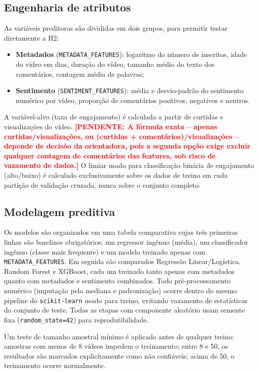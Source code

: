 \documentclass[12pt,a4paper]{article}
\newcommand{\pendente}[1]{\textcolor{red}{\textbf{[PENDENTE: #1]}}}
\begin{document}
\subsection{Engenharia de atributos}

As variáveis preditoras são divididas em dois grupos, para permitir testar diretamente a H2:

\begin{itemize}
    \item \textbf{Metadados} (\texttt{METADATA\_FEATURES}): logaritmo do número de inscritos, idade do vídeo em dias, duração do vídeo, tamanho médio do texto dos comentários, contagem média de palavras;
    \item \textbf{Sentimento} (\texttt{SENTIMENT\_FEATURES}): média e desvio-padrão do sentimento numérico por vídeo, proporção de comentários positivos, negativos e neutros.
\end{itemize}

A variável-alvo (taxa de engajamento) é calculada a partir de curtidas e visualizações do vídeo. \pendente{A fórmula exata -- apenas curtidas/visualizações, ou (curtidas + comentários)/visualizações -- depende de decisão da orientadora, pois a segunda opção exige excluir qualquer contagem de comentários das features, sob risco de vazamento de dados.} O limiar usado para classificação binária de engajamento (alto/baixo) é calculado exclusivamente sobre os dados de treino em cada partição de validação cruzada, nunca sobre o conjunto completo.

\subsection{Modelagem preditiva}

Os modelos são organizados em uma tabela comparativa cujas três primeiras linhas são baselines obrigatórios: um regressor ingênuo (média), um classificador ingênuo (classe mais frequente) e um modelo treinado apenas com \texttt{METADATA\_FEATURES}. Em seguida são comparados Regressão Linear/Logística, Random Forest e XGBoost, cada um treinado tanto apenas com metadados quanto com metadados e sentimento combinados. Todo pré-processamento numérico (imputação pela mediana e padronização) ocorre dentro do mesmo pipeline do \texttt{scikit-learn} usado para treino, evitando vazamento de estatísticas do conjunto de teste. Todas as etapas com componente aleatório usam semente fixa (\texttt{random\_state=42}) para reprodutibilidade.

Um teste de tamanho amostral mínimo é aplicado antes de qualquer treino: amostras com menos de 8 vídeos impedem o treinamento; entre 8 e 50, os resultados são marcados explicitamente como não confiáveis; acima de 50, o treinamento ocorre normalmente.
\end{document}
